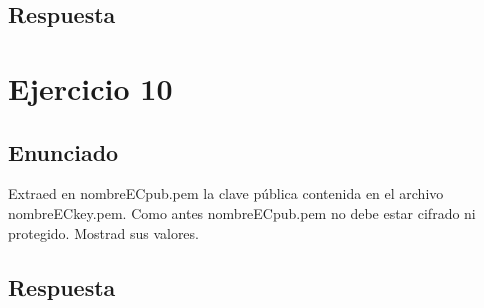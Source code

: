 \documentclass[10pt,a4paper,spanish]{report}
\begin{document}
\section{Respuesta}
\noindent


\chapter{Ejercicio 10}

\section{Enunciado}
\noindent
Extraed en nombreECpub.pem la clave pública contenida en el archivo nombreECkey.pem. Como antes nombreECpub.pem no debe estar cifrado ni protegido. Mostrad sus valores.

\section{Respuesta}
\noindent

\end{document}
